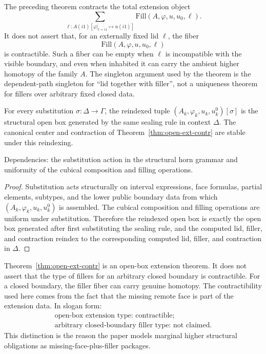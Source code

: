\documentclass{lmcs}
\begin{document}
\begin{rem}
\label{rem:fixed-lid-fibers}
The preceding theorem contracts the total extension object
\[
  \sum_{\ell:A(i1)[\varphi|_{t=i1}\mapsto u(i1)]}
  \mathrm{Fill}(A,\varphi,u,u_0,\ell).
\]
It does not assert that, for an externally fixed lid \(\ell\), the fiber
\[
  \mathrm{Fill}(A,\varphi,u,u_0,\ell)
\]
is contractible.  Such a fiber can be empty when \(\ell\) is incompatible with the visible
boundary, and even when inhabited it can carry the ambient higher homotopy of the family
\(A\).  The singleton argument used by the theorem is the dependent-path singleton for
``lid together with filler'', not a uniqueness theorem for fillers over arbitrary fixed
closed data.
\end{rem}

\begin{lem}
\label{lem:open-box-substitution}
For every substitution \(\sigma:\Delta\to\Gamma\), the reindexed tuple
\((A_k,\varphi_k,u_k,u^0_k)[\sigma]\) is the structural open box generated by the same
sealing rule in context \(\Delta\).  The canonical center and contraction of
Theorem~\ref{thm:open-ext-contr} are stable under this reindexing.

Dependencies: the substitution action in the structural horn grammar and uniformity of the
cubical composition and filling operations.
\end{lem}

\begin{proof}
Substitution acts structurally on interval expressions, face formulas, partial elements,
subtypes, and the lower public boundary data from which \((A_k,\varphi_k,u_k,u^0_k)\) is
assembled.  The cubical composition and filling operations are uniform under substitution.
Therefore the reindexed open box is exactly the open box generated after first substituting
the sealing rule, and the computed lid, filler, and contraction reindex to the corresponding
computed lid, filler, and contraction in \(\Delta\).
\end{proof}

\begin{rem}
\label{rem:open-not-closed}
Theorem~\ref{thm:open-ext-contr} is an open-box extension theorem.  It does not assert that
the type of fillers for an arbitrary closed boundary is contractible.  For a closed boundary,
the filler fiber can carry genuine homotopy.  The contractibility used here comes from the
fact that the missing remote face is part of the extension data.  In slogan form:
\[
  \begin{gathered}
  \text{open-box extension type: contractible;}\\
  \text{arbitrary closed-boundary filler type: not claimed.}
  \end{gathered}
\]
This distinction is the reason the paper models marginal higher structural obligations as
missing-face-plus-filler packages.
\end{rem}
\end{document}
